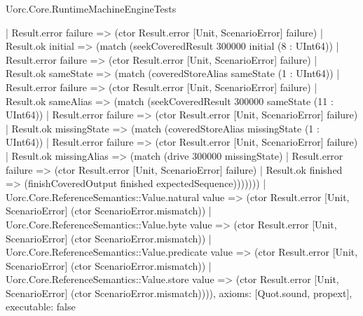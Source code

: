 \begin{lexlean}{Uorc.Core.RuntimeMachineEngineTests}
\begin{semanticmodule}
{        | Result.error failure => (ctor Result.error [Unit, ScenarioError] failure)
        | Result.ok initial => (match (seekCoveredResult 300000 initial (8 : UInt64))
          | Result.error failure => (ctor Result.error [Unit, ScenarioError] failure)
          | Result.ok sameState => (match (coveredStoreAlias sameState (1 : UInt64))
            | Result.error failure => (ctor Result.error [Unit, ScenarioError] failure)
            | Result.ok sameAlias => (match (seekCoveredResult 300000 sameState (11 : UInt64))
              | Result.error failure => (ctor Result.error [Unit, ScenarioError] failure)
              | Result.ok missingState => (match (coveredStoreAlias missingState (1 : UInt64))
                | Result.error failure => (ctor Result.error [Unit, ScenarioError] failure)
                | Result.ok missingAlias => (match (drive 300000 missingState)
                  | Result.error failure => (ctor Result.error [Unit, ScenarioError] failure)
                  | Result.ok finished => (finishCoveredOutput finished expectedSequence)))))))
      | Uorc.Core.ReferenceSemantics::Value.natural value => (ctor Result.error [Unit, ScenarioError] (ctor ScenarioError.mismatch))
      | Uorc.Core.ReferenceSemantics::Value.byte value => (ctor Result.error [Unit, ScenarioError] (ctor ScenarioError.mismatch))
      | Uorc.Core.ReferenceSemantics::Value.predicate value => (ctor Result.error [Unit, ScenarioError] (ctor ScenarioError.mismatch))
      | Uorc.Core.ReferenceSemantics::Value.store value => (ctor Result.error [Unit, ScenarioError] (ctor ScenarioError.mismatch)))),
  axioms: [Quot.sound, propext],
  executable: false
}


\end{semanticmodule}
\end{lexlean}
